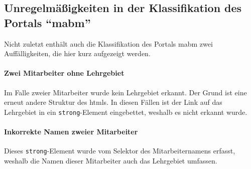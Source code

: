 \subsection{Unregelmäßigkeiten in der Klassifikation des Portals "`\acrshort{mabm}"'}
    Nicht zuletzt enthält auch die Klassifikation des Portals
    \gls{mabm}
    zwei Auffälligkeiten,
    die hier kurz aufgezeigt werden.

    \paragraph{Zwei Mitarbeiter ohne Lehrgebiet}
    Im Falle zweier Mitarbeiter wurde kein Lehrgebiet erkannt.
    Der Grund ist eine erneut andere Struktur des \glspl{html}.
    In diesen Fällen ist der Link auf das Lehrgebiet
    in ein \texttt{strong}-Element eingebettet, weshalb es nicht erkannt wurde.

    \paragraph{Inkorrekte Namen zweier Mitarbeiter}
    Dieses \texttt{strong}-Element wurde vom Selektor des Mitarbeiternamens erfasst,
    weshalb die Namen dieser Mitarbeiter auch das Lehrgebiet umfassen.
